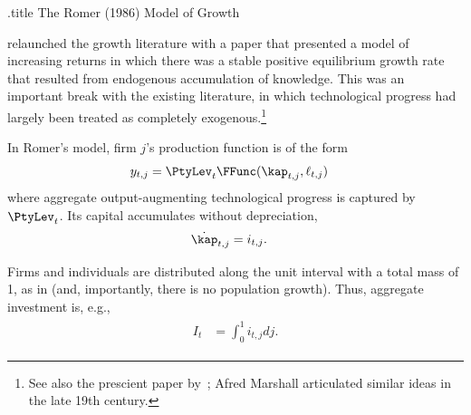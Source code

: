\documentclass{handout} \usepackage{handoutSetup}\usepackage{handoutShortcuts} %
\begin{document}
\handoutHeader


\begin{verbatimwrite}{\jobname.title}
The Romer (1986) Model of Growth
\end{verbatimwrite}

\handoutNameMake

\cite{romer:growth} relaunched the growth literature with a paper that
presented a model of increasing returns in which there was a stable
positive equilibrium growth rate that resulted from endogenous accumulation
of knowledge.  This was an important break with the existing literature,
in which technological progress had largely been treated as completely 
exogenous.\footnote{See also the prescient paper by~\cite{arrowGrowth};
Afred Marshall articulated similar ideas in the late 19th century.}

In Romer's model, firm $j$'s production function is of the form
\begin{equation}\begin{gathered}\begin{aligned}
  y_{t,j} & =  \PtyLev_{t} \FFunc(\kap_{t,j},\ell_{t,j})
\end{aligned}\end{gathered}\end{equation}
where aggregate output-augmenting technological progress is captured by
$\PtyLev_{t}$.  Its capital accumulates without depreciation,
\begin{equation}\begin{gathered}\begin{aligned}
  \label{eq:Kdot}
  \dot{\kap}_{t,j} & =  i_{t,j}.
\end{aligned}\end{gathered}\end{equation}

Firms and individuals are distributed along the unit interval with a total mass of 1,
as in  (and,
importantly, there is no population growth).  Thus, aggregate investment is, e.g.,
\begin{equation}\begin{gathered}\begin{aligned}
  \label{eq:1}
  I_{t} & =  \int_{0}^{1} i_{t,j} dj
.
\end{aligned}\end{gathered}\end{equation}
\end{document}
